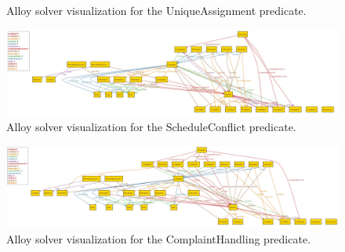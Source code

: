 \begin{figure}
\centering
{}
\caption{\label{fig:metamodel}Alloy solver visualization for the UniqueAssignment predicate.}
\end{figure}


\begin{figure}
\centering
\includegraphics[width=\textwidth, angle=0]{Images/Alloy3.jpg}
\caption{\label{fig:metamodel}Alloy solver visualization for the ScheduleConflict predicate.}
\end{figure}

\begin{figure}
\centering
\includegraphics[width=\textwidth, angle=0]{Images/Alloy4.jpg}
\caption{\label{fig:metamodel}Alloy solver visualization for the ComplaintHandling predicate.}
\end{figure}

